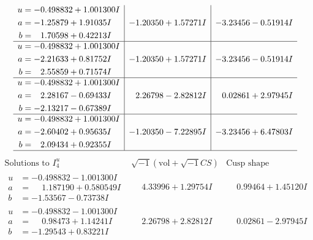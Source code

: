 \documentclass[1p]{elsarticle_modified}
\theoremstyle{definition}
\newcommand{\I}{\sqrt{-1}}
\begin{document}
$$\begin{array}{c|c|c}
\begin{aligned}
u &= -0.498832 + 1.001300 I \\
a &= -1.25879 + 1.91035 I \\
b &= \phantom{-}1.70598 + 0.42213 I\end{aligned}
 & -1.20350 + 1.57271 I & -3.23456 - 0.51914 I \\ \hline\begin{aligned}
u &= -0.498832 + 1.001300 I \\
a &= -2.21633 + 0.81752 I \\
b &= \phantom{-}2.55859 + 0.71574 I\end{aligned}
 & -1.20350 + 1.57271 I & -3.23456 - 0.51914 I \\ \hline\begin{aligned}
u &= -0.498832 + 1.001300 I \\
a &= \phantom{-}2.28167 - 0.69433 I \\
b &= -2.13217 - 0.67389 I\end{aligned}
 & \phantom{-}2.26798 - 2.82812 I & \phantom{-}0.02861 + 2.97945 I \\ \hline\begin{aligned}
u &= -0.498832 + 1.001300 I \\
a &= -2.60402 + 0.95635 I \\
b &= \phantom{-}2.09434 + 0.92355 I\end{aligned}
 & -1.20350 - 7.22895 I & -3.23456 + 6.47803 I\\
 \hline 
 \end{array}$$\newpage$$\begin{array}{c|c|c}  
\text{Solutions to }I^u_{4}& \I (\text{vol} + \sqrt{-1}CS) & \text{Cusp shape}\\
 \hline 
\begin{aligned}
u &= -0.498832 - 1.001300 I \\
a &= \phantom{-}1.187190 + 0.580549 I \\
b &= -1.53567 - 0.73738 I\end{aligned}
 & \phantom{-}4.33996 + 1.29754 I & \phantom{-}0.99464 + 1.45120 I \\ \hline\begin{aligned}
u &= -0.498832 - 1.001300 I \\
a &= \phantom{-}0.98473 + 1.14241 I \\
b &= -1.29543 + 0.83221 I\end{aligned}
 & \phantom{-}2.26798 + 2.82812 I & \phantom{-}0.02861 - 2.97945 I \\ \hline\begin{aligned}

\end{aligned}
\end{array}$$
\end{document}
